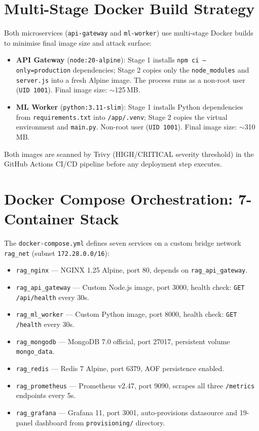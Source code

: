 \documentclass[12pt,a4paper]{report}
\begin{document}
\section{Multi-Stage Docker Build Strategy}

Both microservices (\texttt{api-gateway} and \texttt{ml-worker}) use multi-stage
Docker builds to minimise final image size and attack surface:

\begin{itemize}[leftmargin=1.5cm]
  \item \textbf{API Gateway} (\texttt{node:20-alpine}): Stage 1 installs
        \texttt{npm ci --only=production} dependencies; Stage 2 copies only
        the \texttt{node\_modules} and \texttt{server.js} into a fresh Alpine
        image. The process runs as a non-root user (\texttt{UID 1001}).
        Final image size: $\sim$125\,MB.
  \item \textbf{ML Worker} (\texttt{python:3.11-slim}): Stage 1 installs
        Python dependencies from \texttt{requirements.txt} into
        \texttt{/app/.venv}; Stage 2 copies the virtual environment and
        \texttt{main.py}. Non-root user (\texttt{UID 1001}).
        Final image size: $\sim$310\,MB.
\end{itemize}

Both images are scanned by Trivy (HIGH/CRITICAL severity threshold) in the
GitHub Actions CI/CD pipeline before any deployment step executes.

\section{Docker Compose Orchestration: 7-Container Stack}

The \texttt{docker-compose.yml} defines seven services on a custom bridge
network \texttt{rag\_net} (subnet \texttt{172.28.0.0/16}):

\begin{itemize}[leftmargin=1.5cm]
  \item \texttt{rag\_nginx} --- NGINX 1.25 Alpine, port 80, depends on
        \texttt{rag\_api\_gateway}.
  \item \texttt{rag\_api\_gateway} --- Custom Node.js image, port 3000,
        health check: \texttt{GET /api/health} every 30s.
  \item \texttt{rag\_ml\_worker} --- Custom Python image, port 8000,
        health check: \texttt{GET /health} every 30s.
  \item \texttt{rag\_mongodb} --- MongoDB 7.0 official, port 27017,
        persistent volume \texttt{mongo\_data}.
  \item \texttt{rag\_redis} --- Redis 7 Alpine, port 6379, AOF persistence enabled.
  \item \texttt{rag\_prometheus} --- Prometheus v2.47, port 9090, scrapes all
        three \texttt{/metrics} endpoints every 5s.
  \item \texttt{rag\_grafana} --- Grafana 11, port 3001, auto-provisions
        datasource and 19-panel dashboard from \texttt{provisioning/} directory.
\end{itemize}
\end{document}
